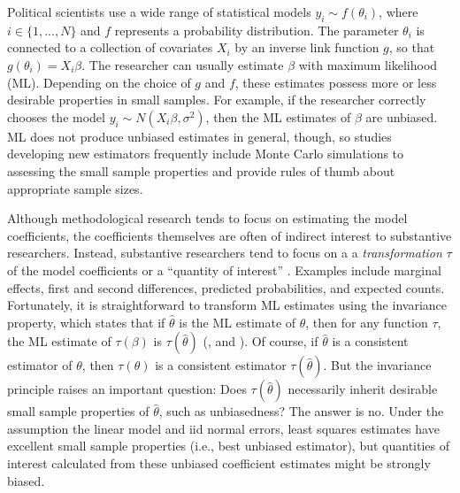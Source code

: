 \documentclass[12pt]{article}
\begin{document}
Political scientists use a wide range of statistical models $y_i \sim f(\theta_i)$, where $i \in \{1,..., N\}$ and $f$ represents a probability distribution. The parameter $\theta_i$ is connected to a collection of covariates $X_i$ by an inverse link function $g$, so that $g(\theta_i) = X_i\beta$. The researcher can usually estimate $\beta$ with maximum likelihood (ML). Depending on the choice of $g$ and $f$, these estimates possess more or less desirable properties in small samples. For example, if the researcher correctly chooses the model $y_i \sim N(X_i\beta, \sigma^2)$, then the ML estimates of $\beta$ are unbiased. ML does not produce unbiased estimates in general, though, so studies developing new estimators frequently include Monte Carlo simulations to assessing the small sample properties and provide rules of thumb about appropriate sample sizes.

Although methodological research tends to focus on estimating the model coefficients, the coefficients themselves are often of indirect interest to substantive researchers. Instead, substantive researchers tend to focus on a a \textit{transformation} $\tau$ of the model coefficients or a ``quantity of interest'' \citep{KingTomzWittenberg2000}. Examples include marginal effects, first and second differences, predicted probabilities, and expected counts. Fortunately, it is straightforward to transform ML estimates using the invariance property, which states that if $\hat{\theta}$ is the ML estimate of $\theta$, then for any function $\tau$, the ML estimate of $\tau(\beta)$ is $\tau(\hat{\theta})$ (\citealt[pp. 75-76]{King1989}, and \citealt[pp. 320-321]{CasellaBerger2002}). %
Of course, if $\hat{\theta}$ is a consistent estimator of $\theta$, then $\tau(\theta)$ is a consistent estimator $\tau(\hat{\theta})$. But the invariance principle raises an important question: Does $\tau(\hat{\theta})$ necessarily inherit desirable small sample properties of $\hat{\theta}$, such as unbiasedness? The answer is no. Under the assumption the linear model and iid normal errors, least squares estimates have excellent small sample properties (i.e., best unbiased estimator), but quantities of interest calculated from these unbiased coefficient estimates might be strongly biased.
\end{document}
